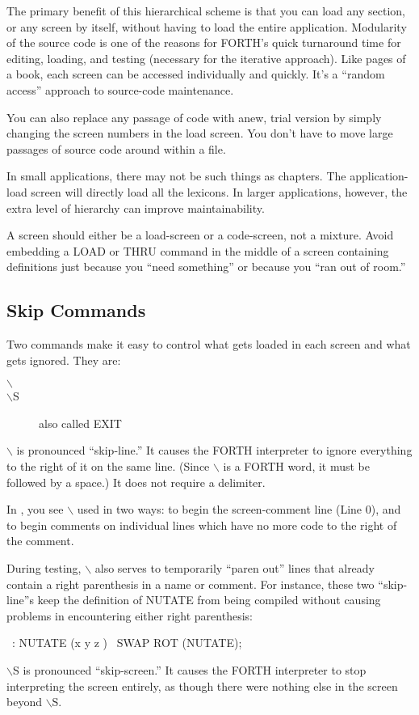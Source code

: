The primary benefit of this hierarchical scheme is that you can load
any section, or any screen by itself, without having to load the entire application.
Modularity of the source code is one of the reasons for
FORTH's quick turnaround time for editing, loading, and testing
(necessary for the iterative approach).  Like pages of a book, each screen
can be accessed individually and quickly.  It's a ``random access'' approach
to source-code maintenance.

You can also replace any passage of code with anew, trial version by
simply changing the screen numbers in the load screen.  You don't have to
move large passages of source code around within a file.

In small applications, there may not be such things as chapters.  The
application-load screen will directly load all the lexicons.  In larger applications,
however, the extra level of hierarchy can improve maintainability.

A screen should either be a load-screen or a code-screen, not a mixture.
Avoid embedding a LOAD or THRU command in the middle of a
screen containing definitions just because you ``need something'' or
because you ``ran out of room.''

\subsection{Skip Commands}

Two commands make it easy to control what gets loaded in each screen
and what gets ignored.  They are:
\begin{description}
\item[\(\backslash\)]
\item[\(\backslash\){}S] also called EXIT
\end{description}
$\backslash${} is pronounced ``skip-line.'' It causes the FORTH interpreter to ignore
everything to the right of it on the same line.  (Since $\backslash${} is a FORTH word, it
must be followed by a space.) It does not require a delimiter.

In , you see $\backslash${} used in two ways: to begin the screen-comment
line (Line 0), and to begin comments on individual lines which
have no more code to the right of the comment.

During testing, $\backslash${} also serves to temporarily ``paren out'' lines that
already contain a right parenthesis in a name or comment.  For instance,
these two ``skip-line''s keep the definition of NUTATE from being compiled
without causing problems in encountering either right parenthesis:
\begin{Code}
\ : NUTATE (x y z )
\ SWAP ROT (NUTATE);
\end{Code}
$\backslash${}S is pronounced ``skip-screen.'' It causes the FORTH interpreter to stop
interpreting the screen entirely, as though there were nothing else in the
screen beyond $\backslash${}S.

